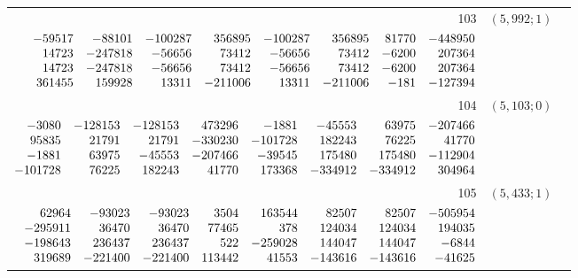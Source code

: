 \documentclass[11pt]{article}
\theoremstyle{remark}
\numberwithin{equation}{section}
\begin{document}
\begin{longtable}{rcl}
103 & $(5,992;1)$ & \begin{tabular}[t]{@{}l@{}}$w_i=\displaystyle \frac{8940520736711881}{4327709614284727991000000000000000}$\\[3pt]{\scriptsize$\begin{array}{@{}rrrrrrrr@{}}-59517 & -88101 & -100287 & 356895 & -100287 & 356895 & 81770 & -448950\\14723 & -247818 & -56656 & 73412 & -56656 & 73412 & -6200 & 207364\\14723 & -247818 & -56656 & 73412 & -56656 & 73412 & -6200 & 207364\\361455 & 159928 & 13311 & -211006 & 13311 & -211006 & -181 & -127394\end{array}$}\end{tabular}\\[8pt]
104 & $(5,103;0)$ & \begin{tabular}[t]{@{}l@{}}$w_i=\displaystyle \frac{2477826471212474797}{2513658021948590739200000000000000000}$\\[3pt]{\scriptsize$\begin{array}{@{}rrrrrrrr@{}}-3080 & -128153 & -128153 & 473296 & -1881 & -45553 & 63975 & -207466\\95835 & 21791 & 21791 & -330230 & -101728 & 182243 & 76225 & 41770\\-1881 & 63975 & -45553 & -207466 & -39545 & 175480 & 175480 & -112904\\-101728 & 76225 & 182243 & 41770 & 173368 & -334912 & -334912 & 304964\end{array}$}\end{tabular}\\[8pt]
105 & $(5,433;1)$ & \begin{tabular}[t]{@{}l@{}}$w_i=\displaystyle \frac{3524220686707390819}{733124843499441639512000000000000000}$\\[3pt]{\scriptsize$\begin{array}{@{}rrrrrrrr@{}}62964 & -93023 & -93023 & 3504 & 163544 & 82507 & 82507 & -505954\\-295911 & 36470 & 36470 & 77465 & 378 & 124034 & 124034 & 194035\\-198643 & 236437 & 236437 & 522 & -259028 & 144047 & 144047 & -6844\\319689 & -221400 & -221400 & 113442 & 41553 & -143616 & -143616 & -41625\end{array}$}\end{tabular}\\[8pt]

\end{longtable}
\end{document}
